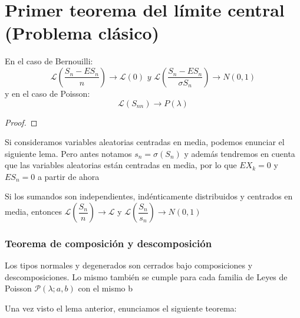 \documentclass[12pt,a4paper]{book}
\begin{document}
\section{Primer teorema del límite central (Problema clásico)}
En el caso de Bernouilli:
$$\mathcal{L}\left( \frac{S_n-ES_n}{n}  \right)\rightarrow \mathcal{L}(0) \,\, y \,\, \mathcal{L}\left( \frac{S_n-ES_n}{\sigma S_n}  \right)\rightarrow N(0,1)$$
y en el caso de Poisson:
$$\mathcal{L}(S_{nn})\rightarrow P(\lambda)$$
\begin{proof}

\end{proof}
Si consideramos variables aleatorias centradas en media, podemos enunciar el siguiente lema. Pero antes notamos $s_n=\sigma(S_n)$ y además tendremos en cuenta que las variables aleatorias están centradas en media, por lo que $EX_k=0$ y $ES_n=0$ a partir de ahora
\begin{lemma}
Si los sumandos son independientes, indénticamente distribuidos y centrados en media, entonces $\mathcal{L} \left( \dfrac{S_n}{n} \right)\rightarrow \mathcal{L}$ y $\mathcal{L} \left( \dfrac{S_n}{s_n} \right)\rightarrow N(0,1)$
\end{lemma}
\subsubsection{Teorema de composición y descomposición}
\begin{theorem}
Los tipos normales y degenerados son cerrados bajo composiciones y descomposiciones. Lo mismo también se cumple para cada familia de Leyes de Poisson $\mathcal{P}(\lambda ; a,b)$ con el mismo b
\end{theorem}
Una vez visto el lema anterior, enunciamos el siguiente teorema:

\end{document}
